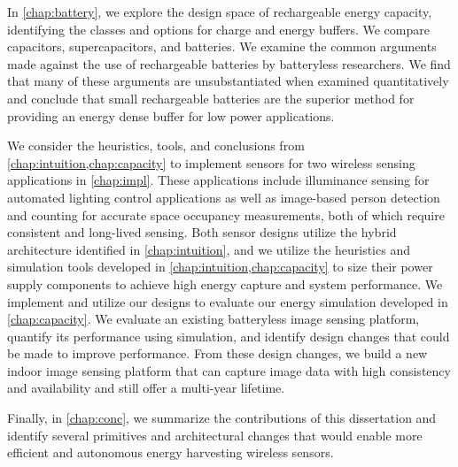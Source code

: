 In \cref{chap:battery}, we explore the design space of rechargeable energy capacity, identifying the classes and options for charge and energy buffers. We compare capacitors, supercapacitors, and batteries. We examine the common arguments made against the use of rechargeable batteries by batteryless researchers.
We find that many of these arguments are unsubstantiated when examined quantitatively and conclude that small rechargeable batteries are the superior method for providing an energy dense buffer for low power applications.

We consider the heuristics, tools, and conclusions from \cref{chap:intuition,chap:capacity} to implement sensors for two wireless sensing applications in \cref{chap:impl}. 
These applications include illuminance sensing for automated lighting control applications as well as image-based person detection and counting for accurate space occupancy measurements, both of which require consistent and long-lived sensing. 
Both sensor designs utilize the hybrid architecture identified in \cref{chap:intuition}, and we utilize the heuristics and simulation tools developed in \cref{chap:intuition,chap:capacity} to size their power supply components to achieve high energy capture and system performance. 
We implement and utilize our designs to evaluate our energy simulation developed in \cref{chap:capacity}. 
We evaluate an existing batteryless image sensing platform, quantify its performance using simulation, and identify design changes that could be made to improve performance.
From these design changes, we build a new indoor image sensing platform that can capture image data with high consistency and availability and still offer a multi-year lifetime. 

Finally, in \cref{chap:conc}, we summarize the contributions of this dissertation and identify several primitives and architectural changes that would enable more efficient and autonomous energy harvesting wireless sensors. 

